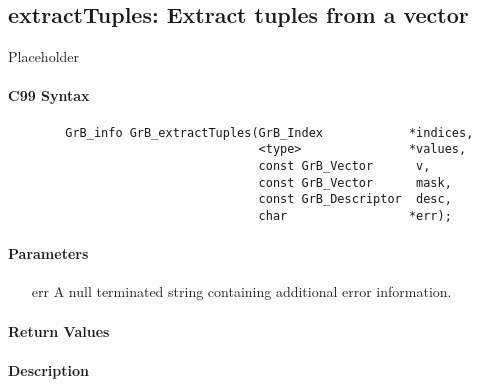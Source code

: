 
\subsection{{\sf extractTuples}: Extract tuples from a vector}
\label{Sec:extractTuples}

Placeholder


\paragraph{C99 Syntax}

\begin{verbatim}
        GrB_info GrB_extractTuples(GrB_Index            *indices,
                                   <type>               *values, 
                                   const GrB_Vector      v,
                                   const GrB_Vector      mask,
                                   const GrB_Descriptor  desc,
                                   char                 *err);

\end{verbatim}

\paragraph{Parameters}
\begin{itemize}
 \item[{\sf err}]     A null terminated string containing additional error information.
\end{itemize}

\paragraph{Return Values}
%
\paragraph{Description}
